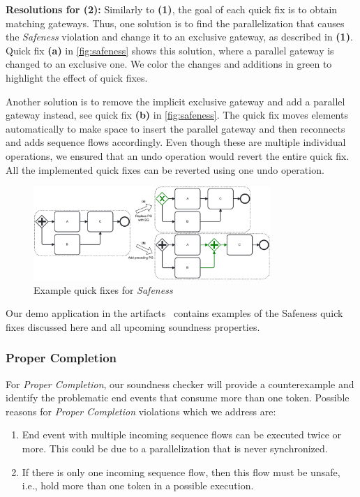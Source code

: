 \documentclass[runningheads]{llncs}
\begin{document}
\textbf{Resolutions for (2):} Similarly to \textbf{(1)}, the goal of each quick fix is to obtain matching gateways.
Thus, one solution is to find the parallelization that causes the \textit{Safeness} violation and change it to an exclusive gateway, as described in \textbf{(1)}.
Quick fix \textbf{(a)} in \autoref{fig:safeness} shows this solution, where a parallel gateway is changed to an exclusive one.
We color the changes and additions in green to highlight the effect of quick fixes.

Another solution is to remove the implicit exclusive gateway and add a parallel gateway instead, see quick fix \textbf{(b)} in \autoref{fig:safeness}.
The quick fix moves elements automatically to make space to insert the parallel gateway and then reconnects and adds sequence flows accordingly.
Even though these are multiple individual operations, we ensured that an undo operation would revert the entire quick fix.
All the implemented quick fixes can be reverted using one undo operation.

\begin{figure}[ht]
	\centering
	\includegraphics[width=0.8\textwidth]{images/safeness}
	\caption{Example quick fixes for \textit{Safeness}}
	\label{fig:safeness}
\end{figure}

Our demo application in the artifacts~\cite{noauthorgivenBPM2024Artifacts2024} contains examples of the Safeness quick fixes discussed here and all upcoming soundness properties.

\subsubsection{Proper Completion}
For \textit{Proper Completion}, our soundness checker will provide a counterexample and identify the problematic end events that consume more than one token.
Possible reasons for \textit{Proper Completion} violations which we address are:

\begin{enumerate}
	\item End event with multiple incoming sequence flows can be executed twice or more.
	This could be due to a parallelization that is never synchronized.
	\item If there is only one incoming sequence flow, then this flow must be unsafe, i.e., hold more than one token in a possible execution.
\end{enumerate}
\end{document}
